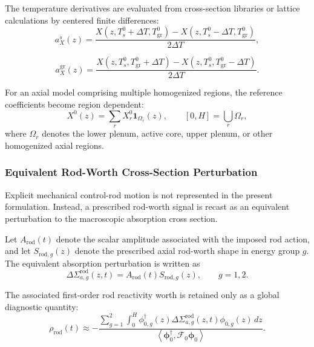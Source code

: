 \documentclass[a4paper,12pt]{article}
\begin{document}
The temperature derivatives are evaluated from cross-section libraries or
lattice calculations by centered finite differences:
\begin{equation}
a_{X}^{s}(z)
=
\frac{
X(z,T_s^{0}+\Delta T,T_{\mathrm{gr}}^{0})
-
X(z,T_s^{0}-\Delta T,T_{\mathrm{gr}}^{0})
}
{2\Delta T},
\label{eq:xs_derivative_salt}
\end{equation}

\begin{equation}
a_{X}^{\mathrm{gr}}(z)
=
\frac{
X(z,T_s^{0},T_{\mathrm{gr}}^{0}+\Delta T)
-
X(z,T_s^{0},T_{\mathrm{gr}}^{0}-\Delta T)
}
{2\Delta T}.
\label{eq:xs_derivative_graphite}
\end{equation}

For an axial model comprising multiple homogenized regions, the reference
coefficients become region dependent:
\begin{equation}
X^{0}(z)
=
\sum_{r}
X_{r}^{0}\mathbf{1}_{\Omega_r}(z),
\qquad
[0,H]=\bigcup_r \Omega_r,
\label{eq:region_dependent_xs}
\end{equation}
where $\Omega_r$ denotes the lower plenum, active core, upper plenum, or
other homogenized axial regions.

\subsubsection{Equivalent Rod-Worth Cross-Section Perturbation}

Explicit mechanical control-rod motion is not represented in the present
formulation. Instead, a prescribed rod-worth signal is recast as an
equivalent perturbation to the macroscopic absorption cross section.

Let $A_{\mathrm{rod}}(t)$ denote the scalar amplitude associated with the
imposed rod action, and let $S_{\mathrm{rod},g}(z)$ denote the prescribed
axial rod-worth shape in energy group $g$. The equivalent absorption
perturbation is written as
\begin{equation}
\Delta\Sigma_{a,g}^{\mathrm{rod}}(z,t)
=
A_{\mathrm{rod}}(t)S_{\mathrm{rod},g}(z),
\qquad
g=1,2.
\label{eq:rod_absorption_perturbation}
\end{equation}

The associated first-order rod reactivity worth is retained only as a
global diagnostic quantity:
\begin{equation}
\rho_{\mathrm{rod}}(t)
\approx
-
\frac{
\displaystyle
\sum_{g=1}^{2}
\int_{0}^{H}
\phi_{0,g}^{\dagger}(z)
\Delta\Sigma_{a,g}^{\mathrm{rod}}(z,t)
\phi_{0,g}(z)\,dz
}
{
\displaystyle
\left\langle
\boldsymbol{\phi}_{0}^{\dagger},
\mathcal{F}_{0}\boldsymbol{\phi}_{0}
\right\rangle
}.
\label{eq:rod_worth}
\end{equation}
\end{document}
